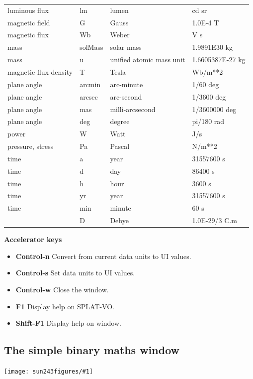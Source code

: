 \documentclass[twoside,11pt]{article}
\newcommand{\htmladdimg}[1]{}
\newcommand{\latexhtml}[2]{#1}
\renewcommand{\_}{\texttt{\symbol{95}}}
\newcommand{\SPLAT}{\textsf{SPLAT-VO}}
\newcommand{\mainfigure}[1]
{\begin{center}
 \latexhtml{\texttt{[image: sun243\_figures/\#1]}}{\htmladdimg{#1.gif}}
 \end{center}
}
\newcommand{\labelitem}[1]{\textbf{#1}}
\newcommand{\subheading}[1]{\textbf{\large{#1}}}
\begin{document}
\begin{center}
\begin{tabular}{|l|l|l|l|}
luminous flux & lm & lumen & cd sr \\
magnetic field & G & Gauss & 1.0E-4 T \\
magnetic flux & Wb & Weber & V s \\
mass & solMass & solar mass & 1.9891E30 kg \\
mass & u & unified atomic mass unit & 1.6605387E-27 kg \\
magnetic flux density & T & Tesla & Wb/m**2 \\
plane angle  & arcmin & arc-minute & 1/60 deg \\
plane angle  & arcsec & arc-second & 1/3600 deg \\
plane angle  & mas & milli-arcsecond & 1/3600000 deg \\
plane angle & deg & degree & pi/180 rad \\
power & W & Watt & J/s \\
pressure, stress & Pa & Pascal & N/m**2 \\
time  & a & year & 31557600 s \\
time  & d & day & 86400 s \\
time  & h & hour & 3600 s \\
time  & yr & year & 31557600 s \\
time  & min & minute & 60 s \\
      & D & Debye & 1.0E-29/3 C.m \\
\hline
\end{tabular}
\end{center}

\subheading{Accelerator keys}

\begin{itemize}
\item \labelitem{Control-n} Convert from current data units to UI values.
\item \labelitem{Control-s} Set data units to UI values.
\item \labelitem{Control-w} Close the window.
\item \labelitem{F1} Display help on \SPLAT.
\item \labelitem{Shift-F1} Display help on window.
\end{itemize}


\newpage
\subsection{The simple binary maths window}

\mainfigure{binarymathwindow}
\end{document}
